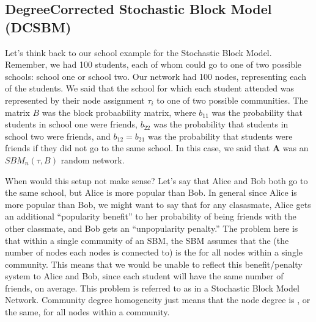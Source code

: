\documentclass[letterpaper,10pt,english]{jupyterBook}
\begin{document}
\subsection{Degree\sphinxhyphen{}Corrected Stochastic Block Model (DCSBM)}
\label{\detokenize{representations/ch5/single-network-models_theory:degree-corrected-stochastic-block-model-dcsbm}}
\sphinxAtStartPar
Let’s think back to our school example for the Stochastic Block Model. Remember, we had 100 students, each of whom could go to one of two possible schools: school one or school two. Our network had 100 nodes, representing each of the students. We said that the school for which each student attended was represented by their node assignment \(\tau_i\) to one of two possible communities. The matrix \(B\) was the block probaability matrix, where \(b_{11}\) was the probability that students in school one were friends, \(b_{22}\) was the probability that students in school two were friends, and \(b_{12} = b_{21}\) was the probability that students were friends if they did not go to the same school. In this case, we said that \(\mathbf A\) was an \(SBM_n(\tau, B)\) random network.

\sphinxAtStartPar
When would this setup not make sense? Let’s say that Alice and Bob both go to the same school, but Alice is more popular than Bob. In general since Alice is more popular than Bob, we might want to say that for any clasasmate, Alice gets an additional “popularity benefit” to her probability of being friends with the other classmate, and Bob gets an “unpopularity penalty.” The problem here is that within a single community of an SBM, the SBM assumes that the  (the number of nodes each nodes is connected to) is the  for all nodes within a single community. This means that we would be unable to reflect this benefit/penalty system to Alice and Bob, since each student will have the same number of friends, on average. This problem is referred to as  in a Stochastic Block Model Network. Community degree homogeneity just means that the node degree is , or the same, for all nodes within a community.
\end{document}
